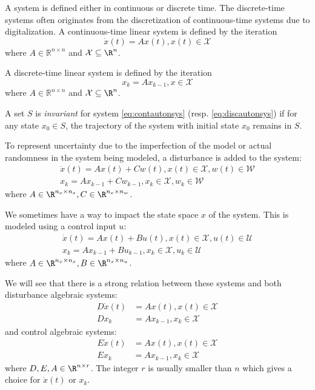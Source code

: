 \documentclass[11pt,twoside,a4paper,openright]{uclouvain-thesis}
\begin{document}
A system is defined either in continuous or discrete time.
The discrete-time systems often originates from the discretization of continuous-time systems
due to digitalization.
A continuous-time linear system is defined by the iteration
\begin{equation}
  \label{eq:contautonsys}
  \dot{x}(t) = A x(t), x(t) \in \mathcal{X}
\end{equation}
where $A \in \mathbb{R}^{n \times n}$ and $\mathcal{X} \subseteq \R^n$.

A discrete-time linear system is defined by the iteration
\begin{equation}
  \label{eq:discautonsys}
  x_k = A x_{k-1}, x \in \mathcal{X}
\end{equation}
where $A \in \mathbb{R}^{n \times n}$ and $\mathcal{X} \subseteq \R^n$.

\begin{mydef}
  \label{def:autoninv}
  A set $S$ is \emph{invariant} for system \eqref{eq:contautonsys} (resp. \eqref{eq:discautonsys})
  if for any state $x_0 \in S$, the trajectory of the system with initial state $x_0$
  remains in $S$.
\end{mydef}

To represent uncertainty due to the imperfection of the model or actual randomness in the system being modeled,
a disturbance is added to the system:
\begin{align}
  \label{eq:contdisturbsys}
  \dot{x}(t) = A x(t) + C w(t), x(t) \in \mathcal{X}, w(t) \in \mathcal{W}\\
  \label{eq:discdisturbsys}
  x_k = A x_{k-1} + C w_{k-1}, x_k \in \mathcal{X}, w_k \in \mathcal{W}
\end{align}
where $A \in \R^{n_x \times n_x}, C \in \R^{n_x \times n_w}$.

We sometimes have a way to impact the state space $x$ of the system.
This is modeled using a control input $u$:
\begin{align}
  \label{eq:contcontrolsys}
  \dot{x}(t) = A x(t) + B u(t), x(t) \in \mathcal{X}, u(t) \in \mathcal{U}\\
  \label{eq:disccontrolsys}
  x_k = A x_{k-1} + B u_{k-1}, x_k \in \mathcal{X}, u_k \in \mathcal{U}
\end{align}
where $A \in \R^{n_x \times n_x}, B \in \R^{n_x \times n_u}$.



We will see that there is a strong relation between these systems and both disturbance algebraic systems:
\begin{align}
  \label{eq:contdisturbalgsys}
  D\dot{x}(t) & = A x(t), x(t) \in \mathcal{X}\\
  \label{eq:discdisturbalgsys}
  Dx_k & = A x_{k-1}, x_k \in \mathcal{X}
\end{align}
and control algebraic systems:
\begin{align}
  \label{eq:contcontrolalgsys}
  E\dot{x}(t) & = A x(t), x(t) \in \mathcal{X}\\
  \label{eq:disccontrolalgsys}
  Ex_k & = A x_{k-1}, x_k \in \mathcal{X}
\end{align}
where $D, E, A \in \R^{n \times r}$.
The integer $r$ is usually smaller than $n$ which gives a choice for $\dot{x}(t)$ or $x_k$.
\end{document}

